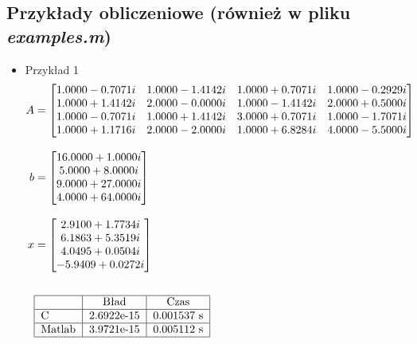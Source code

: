 \documentclass[12pt, flegn, leqno]{article}
\begin{document}
        \subsection*{Przykłady obliczeniowe (również w pliku \textit{examples.m})}
            \begin{itemize}
            \item{Przykład 1}
            \begin{align*}
                A &= 
                \begin{bmatrix}
                    1.0000-0.7071i & 1.0000 - 1.4142i & 1.0000 + 0.7071i & 1.0000 - 0.2929i\\
                    1.0000+1.4142i & 2.0000 - 0.0000i & 1.0000 - 1.4142i & 2.0000 + 0.5000i\\
                    1.0000-0.7071i & 1.0000 + 1.4142i & 3.0000 + 0.7071i & 1.0000 - 1.7071i\\
                    1.0000+1.1716i & 2.0000 - 2.0000i & 1.0000 + 6.8284i & 4.0000 - 5.5000i\\
                \end{bmatrix} \\[3mm]
                b &= 
                \begin{bmatrix}
                    16.0000 + 1.0000i\\
                    5.0000 + 8.0000i\\
                    9.0000 +27.0000i\\
                    4.0000 +64.0000i\\
                \end{bmatrix} \\[3mm]
                x &= 
                \begin{bmatrix}
                    2.9100 + 1.7734i\\
                    6.1863 + 5.3519i\\
                    4.0495 + 0.0504i\\
                    -5.9409 + 0.0272i\\
                \end{bmatrix} \\[6mm] 
                &\begin{tabular}{ | l | c | c |}
                    \hline 
                    & Bład & Czas\\ \hline
                    C & 2.6922e-15 & 0.001537 s \\ \hline
                    Matlab & 3.9721e-15 & 0.005112 s \\
                    \hline
                \end{tabular}
            \end{align*}


\end{itemize}
\end{document}

